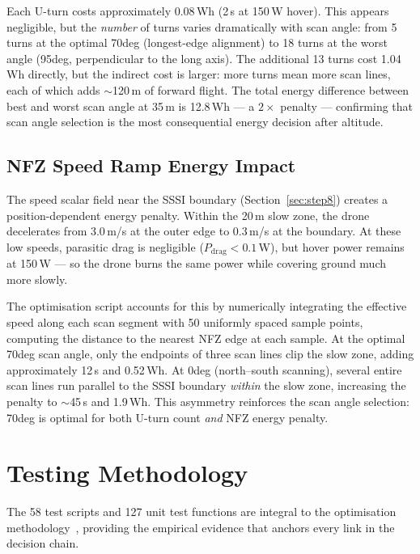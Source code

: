 \documentclass[10pt,a4paper]{article}
\def\textdegree{deg}%
\begin{document}
Each U-turn costs approximately 0.08\,Wh (2\,s at 150\,W hover). This appears negligible, but the \emph{number} of turns varies dramatically with scan angle: from 5 turns at the optimal 70\textdegree{} (longest-edge alignment) to 18 turns at the worst angle (95\textdegree{}, perpendicular to the long axis). The additional 13 turns cost 1.04\,Wh directly, but the indirect cost is larger: more turns mean more scan lines, each of which adds $\sim$120\,m of forward flight. The total energy difference between best and worst scan angle at 35\,m is 12.8\,Wh --- a $2\times$ penalty --- confirming that scan angle selection is the most consequential energy decision after altitude.

\subsection{NFZ Speed Ramp Energy Impact}

The speed scalar field near the SSSI boundary (Section~\ref{sec:step8}) creates a position-dependent energy penalty. Within the 20\,m slow zone, the drone decelerates from 3.0\,m/s at the outer edge to 0.3\,m/s at the boundary. At these low speeds, parasitic drag is negligible ($P_{\mathrm{drag}} < 0.1$\,W), but hover power remains at 150\,W --- so the drone burns the same power while covering ground much more slowly.

The optimisation script accounts for this by numerically integrating the effective speed along each scan segment with 50 uniformly spaced sample points, computing the distance to the nearest NFZ edge at each sample. At the optimal 70\textdegree{} scan angle, only the endpoints of three scan lines clip the slow zone, adding approximately 12\,s and 0.52\,Wh. At 0\textdegree{} (north--south scanning), several entire scan lines run parallel to the SSSI boundary \emph{within} the slow zone, increasing the penalty to $\sim$45\,s and 1.9\,Wh. This asymmetry reinforces the scan angle selection: 70\textdegree{} is optimal for both U-turn count \emph{and} NFZ energy penalty.


\section{Testing Methodology}\label{sec:testing-methodology}

The 58 test scripts and 127 unit test functions are integral to the optimisation methodology~\citep{forsberg1991relationship}, providing the empirical evidence that anchors every link in the decision chain.
\end{document}
